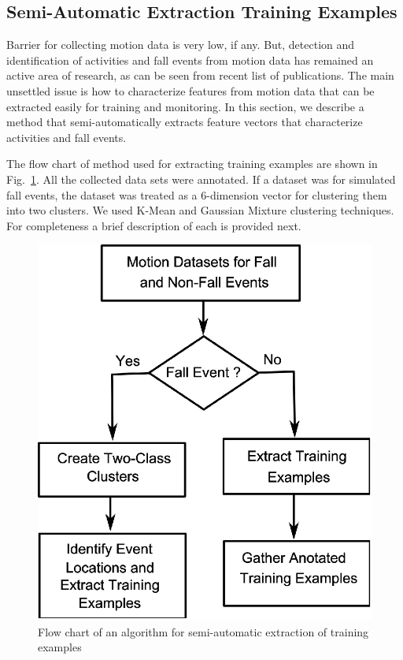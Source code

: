 \documentclass{IEEEtran}
\begin{document}
\subsection{Semi-Automatic  Extraction Training Examples}

Barrier for collecting motion data is very low, if any. But, detection and identification of activities and fall events from motion data has remained an active area of research, as can be seen from recent list of publications. The main unsettled issue is how to characterize features from motion data that can be extracted easily for training and monitoring. In this section, we describe a method that semi-automatically extracts feature vectors that characterize activities and fall events.

The flow chart of method used for extracting training examples are shown in Fig.~\ref{fig:FlowChartforAlgorTrainingExamples}. All the collected data sets were annotated. If a dataset was for simulated fall events, the dataset was treated as a 6-dimension vector for clustering them into two clusters. We used K-Mean and Gaussian Mixture clustering techniques. For completeness a brief description of each is provided next.

\begin{figure}[htb]
	\centering
		\includegraphics[width = 
		0.84\columnwidth]{figures/FlowChartAlgoForTrainingExamples.eps}
	\caption{Flow chart of an algorithm for semi-automatic extraction of training examples}
	\label{fig:FlowChartforAlgorTrainingExamples}
\end{figure}
\end{document}

